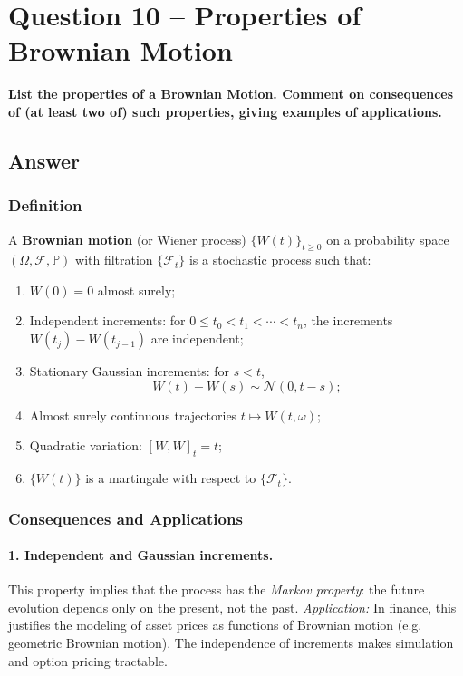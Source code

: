 \documentclass[12pt,a4paper]{book}
\theoremstyle{remark}
\newcommand{\PP}{\mathbb{P}}          %
\newcommand{\F}{\mathcal{F}}          %
\newcommand{\Normal}{\mathcal{N}}
\begin{document}
\newpage
\section{Question 10 -- Properties of Brownian Motion}
\textbf{List the properties of a Brownian Motion. Comment on consequences of (at least two of) such properties, giving examples of applications.}

\subsection*{Answer}

\subsubsection*{Definition}
A \textbf{Brownian motion} (or Wiener process) $\{W(t)\}_{t\ge 0}$ on a probability space $(\Omega,\F,\PP)$ with filtration $\{\F_t\}$ is a stochastic process such that:

\begin{enumerate}[label=\roman*)]
    \item $W(0)=0$ almost surely;
    \item Independent increments: for $0\le t_0 < t_1 < \cdots < t_n$, the increments $W(t_j)-W(t_{j-1})$ are independent;
    \item Stationary Gaussian increments: for $s<t$, 
    \[
    W(t)-W(s) \sim \Normal(0,t-s);
    \]
    \item Almost surely continuous trajectories $t\mapsto W(t,\omega)$;
    \item Quadratic variation: $[W,W]_t = t$;
    \item $\{W(t)\}$ is a martingale with respect to $\{\F_t\}$.
\end{enumerate}

\subsubsection*{Consequences and Applications}

\paragraph{1. Independent and Gaussian increments.}
This property implies that the process has the \emph{Markov property}: the future evolution depends only on the present, not the past.  
\emph{Application:} In finance, this justifies the modeling of asset prices as functions of Brownian motion (e.g. geometric Brownian motion). The independence of increments makes simulation and option pricing tractable.
\end{document}

